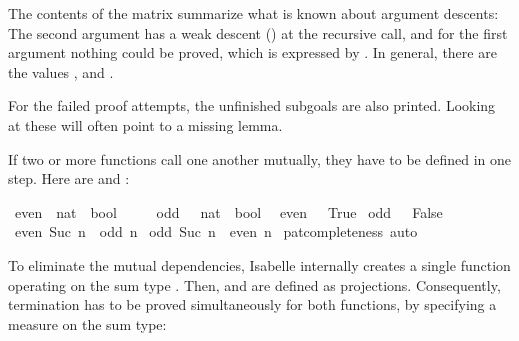 \begin{isabellebody}
\begin{isamarkuptext}
  The contents of the matrix summarize what is known about argument
  descents: The second argument has a weak descent (\isa{{\isacharless}{\isacharequal}}) at the
  recursive call, and for the first argument nothing could be proved,
  which is expressed by \isa{{\isacharquery}}. In general, there are the values
  \isa{{\isacharless}}, \isa{{\isacharless}{\isacharequal}} and \isa{{\isacharquery}}.

  For the failed proof attempts, the unfinished subgoals are also
  printed. Looking at these will often point to a missing lemma.

\end{isamarkuptext}%
\isamarkuptrue%
%
\isamarkuptrue%
%
\begin{isamarkuptext}%
If two or more functions call one another mutually, they have to be defined
  in one step. Here are  and :%
\end{isamarkuptext}%
\isamarkuptrue%
\isamarkupfalse%
\ even\ {\isacharcolon}{\isacharcolon}\ {\isachardoublequoteopen}nat\ {\isasymRightarrow}\ bool{\isachardoublequoteclose}\isanewline
\ \ \ \ \ odd\ \ {\isacharcolon}{\isacharcolon}\ {\isachardoublequoteopen}nat\ {\isasymRightarrow}\ bool{\isachardoublequoteclose}\isanewline
{}\isanewline
\ \ {\isachardoublequoteopen}even\ {}\ {\isacharequal}\ True{\isachardoublequoteclose}\isanewline
{\isacharbar}\ {\isachardoublequoteopen}odd\ {}\ {\isacharequal}\ False{\isachardoublequoteclose}\isanewline
{\isacharbar}\ {\isachardoublequoteopen}even\ {\isacharparenleft}Suc\ n{\isacharparenright}\ {\isacharequal}\ odd\ n{\isachardoublequoteclose}\isanewline
{\isacharbar}\ {\isachardoublequoteopen}odd\ {\isacharparenleft}Suc\ n{\isacharparenright}\ {\isacharequal}\ even\ n{\isachardoublequoteclose}\isanewline
%
\isadelimproof
%
\endisadelimproof
%
\isatagproof
{}\isamarkupfalse%
\ pat{\isacharunderscore}completeness\ auto%
\endisatagproof
{\isafoldproof}%
%
\isadelimproof
%
\endisadelimproof
%
\begin{isamarkuptext}%
To eliminate the mutual dependencies, Isabelle internally
  creates a single function operating on the sum
  type . Then,  and  are
  defined as projections. Consequently, termination has to be proved
  simultaneously for both functions, by specifying a measure on the
  sum type:%
\end{isamarkuptext}%

\end{isabellebody}
